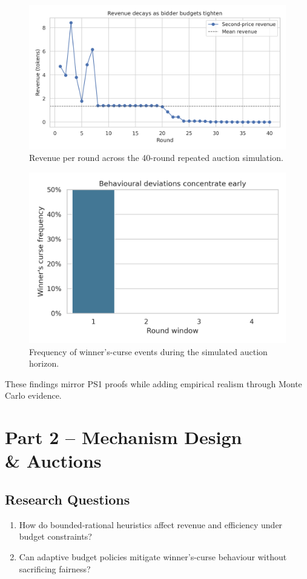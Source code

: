 \documentclass[11pt]{article}
\begin{document}
\begin{figure}[htbp]
  \centering
  \includegraphics[width=0.85\linewidth]{../visualizations/auctions/revenue_by_round.png}
  \caption{Revenue per round across the 40-round repeated auction simulation.}
  \label{fig:revenue-by-round}
\end{figure}

\begin{figure}[htbp]
  \centering
  \includegraphics[width=0.85\linewidth]{../visualizations/auctions/winners_curse_frequency.png}
  \caption{Frequency of winner's-curse events during the simulated auction horizon.}
  \label{fig:winners-curse-frequency}
\end{figure}
These findings mirror PS1 proofs while adding empirical realism through Monte Carlo evidence.

\section{Part 2 -- Mechanism Design \texorpdfstring{\\}{ } \& Auctions}
\subsection{Research Questions}
\begin{enumerate}[leftmargin=*]
  \item How do bounded-rational heuristics affect revenue and efficiency under budget constraints?
  \item Can adaptive budget policies mitigate winner's-curse behaviour without sacrificing fairness?
\end{enumerate}
\end{document}
